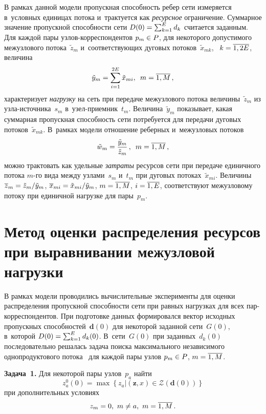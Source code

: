 \begin{multicols}{2}
В рамках данной модели пропускная способность ребер сети измеряется в~условных единицах потока и~трактуется как \textit{ресурсное} ограничение. 
Суммарное значение пропускной способности сети
$ D(0)\hm =  \sum\nolimits_{k=1}^{E} d_k$ считается заданным.
Для каждой пары уз\-лов-кор\-рес\-пон\-ден\-тов $p_m \hm\in P$, для некоторого допустимого межузлового потока~$\tilde{z}_m$ 
и~соответствующих дуговых потоков~$\tilde{x}_{mk}$, \ $k \hm= \ol{1, 2E}$, величина
$$
\tilde{y}_m = \sum\limits_{i=1}^{2E} \tilde{x}_{mi}, \enskip m = \overline{1, M}\,,
$$
характеризует \textit{нагрузку} на сеть  при передаче  межузлового потока величины~$\tilde{z}_m$ из уз\-ла-ис\-точ\-ни\-ка~$s_m$  
в~узел-при\-ем\-ник~$t_m$. Величина~$\tilde{y}_m$ показывает, какая суммарная пропускная способность сети потребуется для передачи дуговых потоков~$\tilde{x}_{mk}$. 
В~рамках модели отношение реберных и~межузловых потоков
$$ 
\tilde{w}_m = \displaystyle\frac{\displaystyle \tilde{y}_m\mathstrut}{\displaystyle \tilde{z}_m\mathstrut}\,,  \enskip m = \overline{1, M}\,,
$$
можно трактовать как удельные {\it затраты}  ресурсов сети при передаче единичного   потока $m$-го вида между узлами~$s_m$ и~$t_m$ 
при  дуговых потоках~$\tilde{x}_{mi}$.
Величины $\ol z_m\hm = \tilde{z}_m/\tilde{y}_m$,  $\ol{x}_{mi}\hm = \tilde{x}_{mi}/ \tilde{y}_m$, 
 $m \hm= \ol{1, M}$,  $i \hm= \ol{1, E}$, соответствуют межузловому потоку при единичной нагрузке для пары~$p_m$.

\section{Метод оценки распределения ресурсов  при выравнивании  
межузловой нагрузки}

В рамках модели проводились вычислительные эксперименты для оценки распределения пропускной способности сети при равных нагрузках для всех 
пар-кор\-рес\-пон\-ден\-тов. При подготовке  данных формировался вектор исходных пропускных способностей~$\mathbf{d}(0)$  для некоторой заданной сети~$G(0)$, 
в~которой $ D(0) \hm=  \sum\nolimits_{k=1}^{E} d_k(0)$.
В~сети~$G(0)$ при заданных~$d_k(0)$ последовательно решалась задача поиска максимального независимого однопродуктового потока~\cite{Yen} 
для каждой пары узлов $p_m \hm\in P$, $m \hm= \ol{1, M}$.

\smallskip

\noindent
\textbf{Задача~1.} Для некоторой пары узлов~$p_a$ найти 
$$ 
z_a^0 (0) = \max \left\{ z_a | (\mathbf{z}, x)  \in \mathcal{Z}(\mathbf{d}(0))\right\} 
 $$
при дополнительных условиях 
$$
z_m = 0,\ m \not = a,\ m = \overline {1, M}\,. 
$$


\end{multicols}
